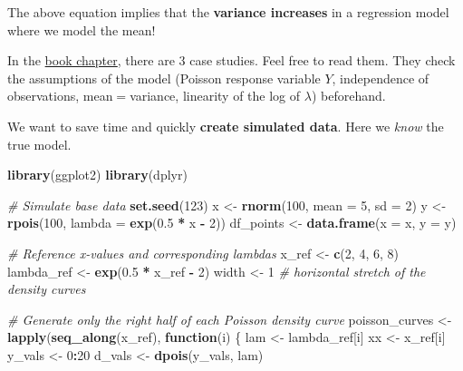 \documentclass[
]{book}
\newenvironment{Shaded}{\begin{snugshade}}{\end{snugshade}}
\newcommand{\AttributeTok}[1]{\textcolor[rgb]{0.13,0.29,0.53}{#1}}
\newcommand{\CommentTok}[1]{\textcolor[rgb]{0.56,0.35,0.01}{\textit{#1}}}
\newcommand{\ControlFlowTok}[1]{\textcolor[rgb]{0.13,0.29,0.53}{\textbf{#1}}}
\newcommand{\DecValTok}[1]{\textcolor[rgb]{0.00,0.00,0.81}{#1}}
\newcommand{\FloatTok}[1]{\textcolor[rgb]{0.00,0.00,0.81}{#1}}
\newcommand{\FunctionTok}[1]{\textcolor[rgb]{0.13,0.29,0.53}{\textbf{#1}}}
\newcommand{\NormalTok}[1]{#1}
\newcommand{\OtherTok}[1]{\textcolor[rgb]{0.56,0.35,0.01}{#1}}
\newcommand{\SpecialCharTok}[1]{\textcolor[rgb]{0.81,0.36,0.00}{\textbf{#1}}}
\begin{document}
The above equation implies that the \textbf{variance increases} in a regression model
where we model the mean!

In the \href{https://bookdown.org/roback/bookdown-BeyondMLR/ch-poissonreg.html}{book chapter},
there are 3 case studies. Feel free to read them.
They check the assumptions of the model
(Poisson response variable \(Y\), independence of observations, mean\(=\)variance,
linearity of the log of \(\lambda\)) beforehand.

We want to save time and quickly \textbf{create simulated data}. Here we \emph{know}
the true model.

\begin{Shaded}
\begin{Highlighting}[]
\FunctionTok{library}\NormalTok{(ggplot2)}
\FunctionTok{library}\NormalTok{(dplyr)}

\CommentTok{\# Simulate base data}
\FunctionTok{set.seed}\NormalTok{(}\DecValTok{123}\NormalTok{)}
\NormalTok{x }\OtherTok{\textless{}{-}} \FunctionTok{rnorm}\NormalTok{(}\DecValTok{100}\NormalTok{, }\AttributeTok{mean =} \DecValTok{5}\NormalTok{, }\AttributeTok{sd =} \DecValTok{2}\NormalTok{)}
\NormalTok{y }\OtherTok{\textless{}{-}} \FunctionTok{rpois}\NormalTok{(}\DecValTok{100}\NormalTok{, }\AttributeTok{lambda =} \FunctionTok{exp}\NormalTok{(}\FloatTok{0.5} \SpecialCharTok{*}\NormalTok{ x }\SpecialCharTok{{-}} \DecValTok{2}\NormalTok{))}
\NormalTok{df\_points }\OtherTok{\textless{}{-}} \FunctionTok{data.frame}\NormalTok{(}\AttributeTok{x =}\NormalTok{ x, }\AttributeTok{y =}\NormalTok{ y)}

\CommentTok{\# Reference x{-}values and corresponding lambdas}
\NormalTok{x\_ref }\OtherTok{\textless{}{-}} \FunctionTok{c}\NormalTok{(}\DecValTok{2}\NormalTok{, }\DecValTok{4}\NormalTok{, }\DecValTok{6}\NormalTok{, }\DecValTok{8}\NormalTok{)}
\NormalTok{lambda\_ref }\OtherTok{\textless{}{-}} \FunctionTok{exp}\NormalTok{(}\FloatTok{0.5} \SpecialCharTok{*}\NormalTok{ x\_ref }\SpecialCharTok{{-}} \DecValTok{2}\NormalTok{)}
\NormalTok{width }\OtherTok{\textless{}{-}} \DecValTok{1}  \CommentTok{\# horizontal stretch of the density curves}

\CommentTok{\# Generate only the right half of each Poisson density curve}
\NormalTok{poisson\_curves }\OtherTok{\textless{}{-}} \FunctionTok{lapply}\NormalTok{(}\FunctionTok{seq\_along}\NormalTok{(x\_ref), }\ControlFlowTok{function}\NormalTok{(i) \{}
\NormalTok{  lam }\OtherTok{\textless{}{-}}\NormalTok{ lambda\_ref[i]}
\NormalTok{  xx }\OtherTok{\textless{}{-}}\NormalTok{ x\_ref[i]}
\NormalTok{  y\_vals }\OtherTok{\textless{}{-}} \DecValTok{0}\SpecialCharTok{:}\DecValTok{20}
\NormalTok{  d\_vals }\OtherTok{\textless{}{-}} \FunctionTok{dpois}\NormalTok{(y\_vals, lam)}
  

\end{Highlighting}
\end{Shaded}
\end{document}
